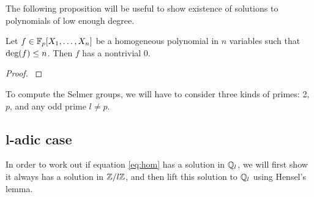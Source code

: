 \documentclass[12pt, a4paper]{report}
\begin{document}
The following proposition will be useful to show existence of solutions
to polynomials of low enough degree.

\begin{prop}
  Let $f \in \mathbb{F}_p[X_1, \dots , X_n]$ be a homogeneous polynomial
  in $n$ variables such that $\textnormal{deg}(f) \leq n$. Then $f$ has a nontrivial 0.
\end{prop}

\begin{proof}
  \cite[See][Chapter 1, page 5]{Serre}
\end{proof}

To compute the Selmer groups, we will have to consider three
kinds of primes: 2, $p$, and any odd prime $l \neq p$.

\subsection{l-adic case}

In order to work out if equation \autoref{eq:hom} has a solution in ${\mathbb Q}_l$,
we will first show it always has a solution 
in ${\mathbb Z}/l{\mathbb Z}$, and then lift this solution to ${\mathbb Q}_l$ using Hensel's lemma.
\end{document}
